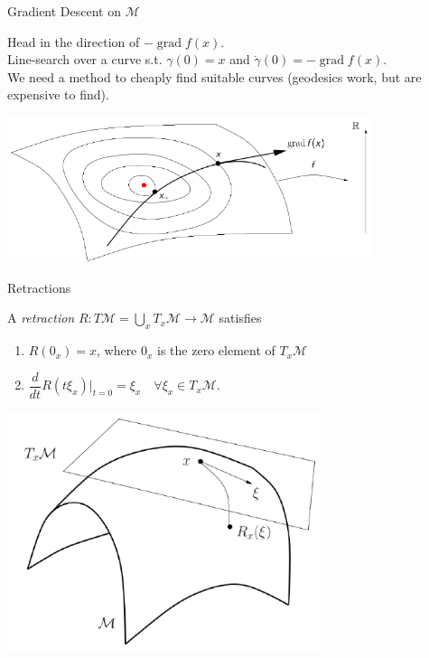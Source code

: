 \documentclass[xcolor=dvipsnames,t]{beamer} %
\newcommand{\diff}[2]{\dfrac{d #1}{d #2}}
\begin{document}
\begin{frame}{Gradient Descent on $\mathcal{M}$}

   Head in the direction of $-\operatorname{grad}f(x)$.\\[0.5em]

   \noindent Line-search over a curve s.t. $\gamma(0)=x$ and $\dot{\gamma}(0)=-\operatorname{grad}f(x)$.\\[0.5em]

   \noindent We need a method to cheaply find suitable curves (geodesics work, but are expensive to find).\\
       
   \begin{center}
      \includegraphics[width=0.8\textwidth]{figures/GD_M.pdf}
   \end{center}

\end{frame}

\begin{frame}{Retractions}
   
   A \emph{retraction} $R:T\mathcal{M}=\bigcup_x T_x\mathcal{M}\to\mathcal{M}$ satisfies
   \begin{enumerate}[1.]
      \item $R(0_x) = x$, where $0_x$ is the zero element of $T_x\mathcal{M}$
      \item $\diff{}{t}R(t\xi_x)\biggr|_{t=0} = \xi_x \quad \forall \xi_x\in T_x\mathcal{M}$.
   \end{enumerate}
   
      
   \begin{center}
      \includegraphics[width=0.7\textwidth]{figures/retraction.pdf}
   \end{center}
\end{frame}
\end{document}
